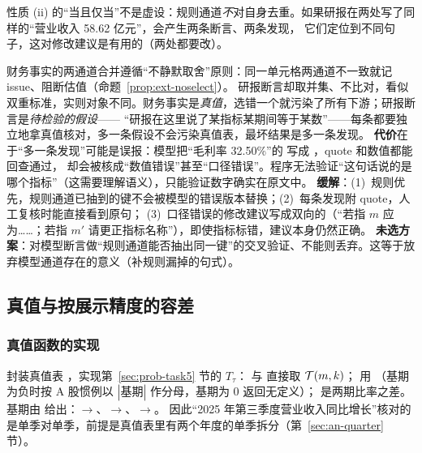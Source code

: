 性质 (ii) 的“当且仅当”不是虚设：规则通道\emph{不}对自身去重。如果研报在两处写了同样的“营业收入 58.62 亿元”，会产生两条断言、两条发现，
它们定位到不同句子，这对修改建议是有用的（两处都要改）。

\begin{tradeoff}
财务事实的两通道合并遵循“不静默取舍”原则：同一单元格两通道不一致就记 issue、阻断估值（命题~\ref{prop:ext-noselect}）。
研报断言却取并集、不比对，看似双重标准，实则对象不同。财务事实是\emph{真值}，选错一个就污染了所有下游；研报断言是\emph{待检验的假设}——
“研报在这里说了某指标某期间等于某数”——每条都要独立地拿真值核对，多一条假设不会污染真值表，最坏结果是多一条发现。
\textbf{代价}在于“多一条发现”可能是误报：模型把“毛利率 32.50\%”的  写成 ，quote 和数值都能回查通过，
却会被核成“数值错误”甚至“口径错误”。程序无法验证“这句话说的是哪个指标”（这需要理解语义），只能验证数字确实在原文中。
\textbf{缓解}：(1)~规则优先，规则通道已抽到的键不会被模型的错误版本替换；(2)~每条发现附 quote，人工复核时能直接看到原句；
(3)~口径错误的修改建议写成双向的（“若指 $m$ 应为……；若指 $m'$ 请更正指标名称”），即使指标标错，建议本身仍然正确。
\textbf{未选方案}：对模型断言做“规则通道能否抽出同一键”的交叉验证、不能则丢弃。这等于放弃模型通道存在的意义（补规则漏掉的句式）。
\end{tradeoff}

\subsection{真值与按展示精度的容差}
\label{sec:rc-tol}

\subsubsection{真值函数的实现}

\begin{sloppypar}
 封装真值表 ，实现第~\ref{sec:prob-task5} 节的 $T_\tau$：
 与  直接取 $\mathcal{T}(m,k)$； 用 （基期为负时按 A 股惯例以 $|\text{基期}|$ 作分母，基期为 0 返回无定义）；
 是两期比率之差。基期由  给出：$\to$、$\to$、$\to$。
因此“2025 年第三季度营业收入同比增长”核对的是单季对单季，前提是真值表里有两个年度的单季拆分（第~\ref{sec:an-quarter} 节）。
\end{sloppypar}

